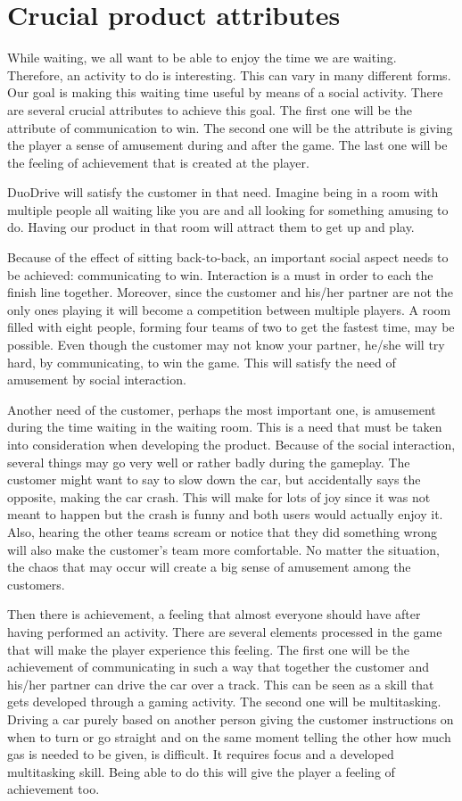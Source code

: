 \documentclass[11pt,twoside,a4paper]{article}
\begin{document}
\section{Crucial product attributes}
While waiting, we all want to be able to enjoy the time we are waiting. Therefore, an activity to do is interesting. This can vary in many different forms. Our goal is making this waiting time useful by means of a social activity. There are several crucial attributes to achieve this goal. The first one will be the attribute of communication to win. The second one will be the attribute is giving the player a sense of amusement during and after the game. The last one will be the feeling of achievement that is created at the player.

DuoDrive will satisfy the customer in that need. Imagine being in a room with multiple people all waiting like you are and all looking for something amusing to do. Having our product in that room will attract them to get up and play.

Because of the effect of sitting back-to-back, an important social aspect needs to be achieved: communicating to win. Interaction is a must in order to each the finish line together. Moreover, since the customer and his/her partner are not the only ones playing it will become a competition between multiple players. A room filled with eight people, forming four teams of two to get the fastest time, may be possible. Even though the customer may not know your partner, he/she will try hard, by communicating, to win the game. This will satisfy the need of amusement by social interaction.

Another need of the customer, perhaps the most important one, is amusement during the time waiting in the waiting room. This is a need that must be taken into consideration when developing the product. Because of the social interaction, several things may go very well or rather badly during the gameplay. The customer might want to say to slow down the car, but accidentally says the opposite, making the car crash. This will make for lots of joy since it was not meant to happen but the crash is funny and both users would actually enjoy it. Also, hearing the other teams scream or notice that they did something wrong will also make the customer's team more comfortable. No matter the situation, the chaos that may occur will create a big sense of amusement among the customers.

Then there is achievement, a feeling that almost everyone should have after having performed an activity. There are several elements processed in the game that will make the player experience this feeling. The first one will be the achievement of communicating in such a way that together the customer and his/her partner can drive the car over a track. This can be seen as a skill that gets developed through a gaming activity. The second one will be multitasking. Driving a car purely based on another person giving the customer instructions on when to turn or go straight and on the same moment telling the other how much gas is needed to be given, is difficult. It requires focus and a developed multitasking skill. Being able to do this will give the player a feeling of achievement too. 
\end{document}
